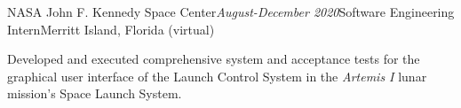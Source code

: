 \begin{rSubsection}{NASA John F. Kennedy Space Center}{\em August-December 2020}{Software Engineering Intern}{Merritt Island, Florida (virtual)}
\item Developed and executed comprehensive system and acceptance tests for the graphical user interface of the Launch Control System in the \textit{Artemis I} lunar mission's Space Launch System.
\end{rSubsection}